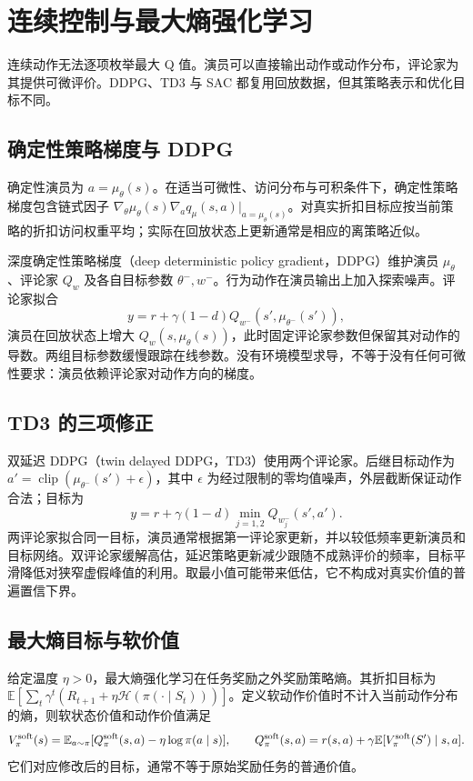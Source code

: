 \setcounter{chapter}{16} %
\chapter{连续控制与最大熵强化学习}
\label{ch:rl-continuous}

连续动作无法逐项枚举最大 Q 值。演员可以直接输出动作或动作分布，评论家为其提供可微评价。DDPG、TD3 与 SAC 都复用回放数据，但其策略表示和优化目标不同\cite{lillicrap-ddpg,fujimoto-td3,haarnoja-sac}。

\section{确定性策略梯度与 DDPG}

确定性演员为 $a=\mu_\theta(s)$。在适当可微性、访问分布与可积条件下，确定性策略梯度包含链式因子 $\nabla_\theta\mu_\theta(s)\nabla_aq_\mu(s,a)|_{a=\mu_\theta(s)}$。对真实折扣目标应按当前策略的折扣访问权重平均；实际在回放状态上更新通常是相应的离策略近似\cite{silver-dpg}。

深度确定性策略梯度（deep deterministic policy gradient，DDPG）维护演员 $\mu_\theta$、评论家 $Q_w$ 及各自目标参数 $\theta^-,w^-$。行为动作在演员输出上加入探索噪声。评论家拟合
\[
y=r+\gamma(1-d)Q_{w^-}(s',\mu_{\theta^-}(s')),
\]
演员在回放状态上增大 $Q_w(s,\mu_\theta(s))$，此时固定评论家参数但保留其对动作的导数。两组目标参数缓慢跟踪在线参数。没有环境模型求导，不等于没有任何可微性要求：演员依赖评论家对动作方向的梯度。

\section{TD3 的三项修正}

双延迟 DDPG（twin delayed DDPG，TD3）使用两个评论家。后继目标动作为 $a'=\operatorname{clip}(\mu_{\theta^-}(s')+\epsilon)$，其中 $\epsilon$ 为经过限制的零均值噪声，外层截断保证动作合法；目标为
\[
y=r+\gamma(1-d)\min_{j=1,2}Q_{w_j^-}(s',a').
\]
两评论家拟合同一目标，演员通常根据第一评论家更新，并以较低频率更新演员和目标网络。双评论家缓解高估，延迟策略更新减少跟随不成熟评价的频率，目标平滑降低对狭窄虚假峰值的利用。取最小值可能带来低估，它不构成对真实价值的普遍置信下界。

\section{最大熵目标与软价值}

给定温度 $\eta>0$，最大熵强化学习在任务奖励之外奖励策略熵。其折扣目标为 $\mathbb E[\sum_t\gamma^t(R_{t+1}+\eta\mathcal H(\pi(\cdot\mid S_t)))]$。定义软动作价值时不计入当前动作分布的熵，则软状态价值和动作价值满足
\[
V_\pi^{\rm soft}(s)=\mathbb E_{a\sim\pi}[Q_\pi^{\rm soft}(s,a)-\eta\log\pi(a\mid s)],\qquad
Q_\pi^{\rm soft}(s,a)=r(s,a)+\gamma\mathbb E[V_\pi^{\rm soft}(S')\mid s,a].
\]
它们对应修改后的目标，通常不等于原始奖励任务的普通价值。

